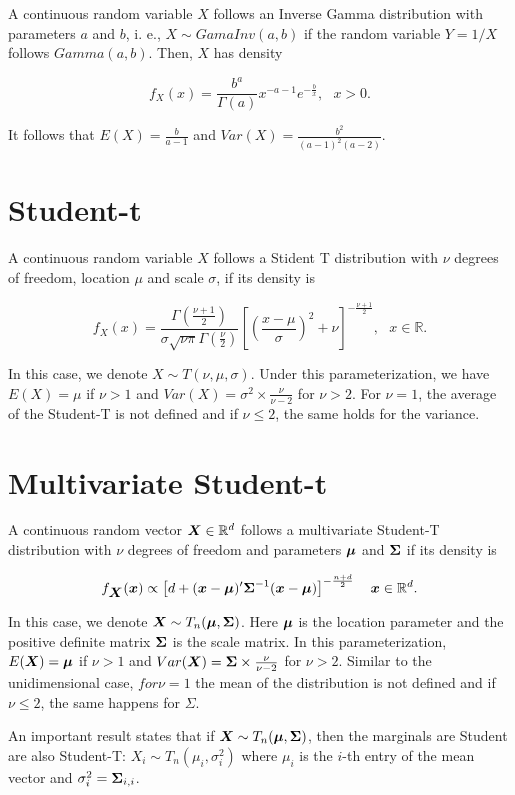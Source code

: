 A continuous random variable $X$ follows an Inverse Gamma distribution with parameters $a$ and $b$, i. e.,  $X\sim GamaInv(a,b)$ if the random variable $Y = 1/X$ follows $Gamma(a, b).$ Then, $X$ has density

$$f_X(x)=\frac{b^a}{\Gamma(a)}x^{-a-1}e^{-\frac{b}{x}}, \ \ \ x>0.$$

It follows that $E(X)=\frac{b}{a-1}$ and $Var(X)=\frac{b^2}{(a-1)^2(a-2)}$.

\section{Student-t}

A continuous random variable $X$ follows a Stident T distribution with $\nu$ degrees of freedom, location $\mu$ and scale $\sigma$, if its density is

$$f_X(x)=\frac{\Gamma{\left(\frac{\nu+1}{2}\right)}}{\sigma\sqrt{\nu\pi}\Gamma(\frac{\nu}{2})}\left[\left(\frac{x-\mu}{\sigma}\right)^2+\nu\right]^{-\frac{\nu+1}{2}}, \ \ \ x\in \mathbb{R}.$$

In this case, we denote $X\sim T(\nu, \mu,\sigma)$. Under this parameterization, we have $E(X)=\mu$ if $\nu>1$ and $Var(X)=\sigma^2\times \frac{\nu}{\nu-2}$ for $\nu>2$. For $\nu = 1$, the average of the Student-T is not defined and if $\nu\leq 2$, the same holds for the variance.

\section{Multivariate Student-t}

A continuous random vector $\mbox{\boldmath $X$} \in \mathbb{R}^d$ follows a multivariate Student-T distribution with $\nu$ degrees of freedom and parameters $\mbox{\boldmath $\mu$}$ and $\mbox{\boldmath $\Sigma$}$ if its density is

$$f_{\mbox{\boldmath $X$}}(\mbox{\boldmath $x$})\propto\left[d+(\mbox{\boldmath $x$}-\mbox{\boldmath $\mu$})'\mbox{\boldmath $\Sigma$}^{-1}(\mbox{\boldmath $x$}-\mbox{\boldmath $\mu$})\right]^{-\frac{n+d}{2}} \ \ \ \mbox{\boldmath $x$}\in \mathbb{R}^d.$$

In this case, we denote $\mbox{\boldmath $X$}\sim T_n(\mbox{\boldmath $\mu$},\mbox{\boldmath $\Sigma$})$. Here $\mbox{\boldmath $\mu$}$ is the location parameter and the positive definite matrix $\mbox{\boldmath $\Sigma$}$ is the scale matrix. In this parameterization, $E(\mbox{\boldmath $X$})=\mbox{\boldmath $\mu$}$ if $\nu>1$ and $Var(\mbox{\boldmath $X$})=\mbox{\boldmath $\Sigma$}\times \frac{\nu}{\nu-2}$ for $\nu>2$. Similar to the unidimensional case, $for \nu=1$ the mean of the distribution is not defined and if $\nu \leq 2$, the same happens for $\Sigma$.

An important result states that if $\mbox{\boldmath $X$}\sim T_n(\mbox{\boldmath $\mu$}, \mbox{\boldmath $\Sigma$})$, then the marginals are Student are also Student-T: $X_i \sim T_n(\mu_i, \sigma^2_i)$ where $\mu_i$ is the $i$-th entry of the mean vector and $\sigma^2_i=\mbox{\boldmath $\Sigma$}_{i,i}$.


